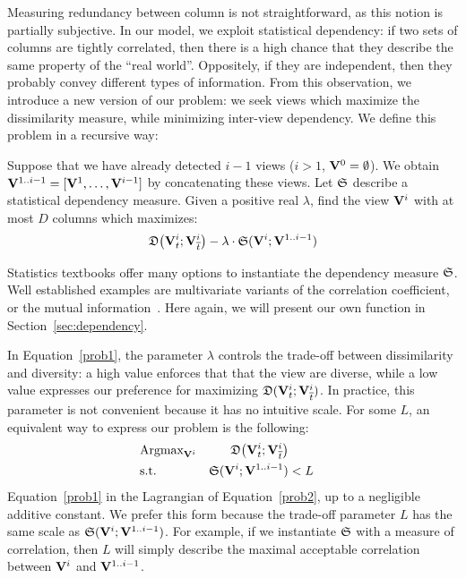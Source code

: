 Measuring redundancy between column is not straightforward, as this notion is
partially subjective. In our model, we exploit statistical dependency: if two
sets of columns are tightly correlated, then there is a high chance that they
describe the same property of the ``real world''.  Oppositely, if they are
independent, then they probably convey different types of information. From
this observation, we introduce a new version of our problem: we seek views
which maximize the dissimilarity measure, while minimizing inter-view dependency.
We define this problem in a recursive way:
\begin{problem}
    Suppose that we have already detected $i-1$ views ($i > 1$,
    $\mathbf{V}^{0} = \emptyset$). We obtain $\mathbf{V}^{1..i-1} = [\mathbf{V}^1, \ldots,
    \mathbf{V}^{i-1}]$ by concatenating these views. Let $\mathfrak{S}$ describe a
    statistical dependency measure. Given a positive real $\lambda$, find the
    view $\mathbf{V}^{i}$ with at most $D$ columns which maximizes:
        \begin{equation}
            \label{prob1}
            \mathfrak{D}\big( \mathbf{V}^{i}_t  ; \mathbf{V}^{i}_{\overline{t}} \big) - 
            \lambda \cdot \mathfrak{S} ( \mathbf{V}^{i} ; \mathbf{V}^{1..i-1})
        \end{equation}
\end{problem}
Statistics textbooks offer many options to instantiate the dependency measure
$\mathfrak{S}$. Well established examples are multivariate variants of the
correlation coefficient, or the mutual information~\cite{wasserman2013all}.
Here again, we will present our own function in Section~\ref{sec:dependency}.

In Equation~\ref{prob1}, the parameter $\lambda$ controls the trade-off between
dissimilarity and diversity: a high value enforces that that the view are
diverse, while a low value expresses our preference for maximizing $\mathfrak{D}(
\mathbf{V}^{i}_t  ; \mathbf{V}^{i}_{\overline{t}})$. In practice, this parameter is
not convenient because it has no intuitive scale. For some $L$, an
equivalent way to express our problem is the following:
\begin{equation}
    \label{prob2}
    \begin{aligned}
        & \text{Argmax}_{\mathbf{V}^{i}} 
            & \mathfrak{D}\big( \mathbf{V}^{i}_t  ; \mathbf{V}^{i}_{\overline{t}} \big)\\
        & \text{s.t.} 
        &\mathfrak{S} ( \mathbf{V}^{i} ; \mathbf{V}^{1..i-1}) & < L\\ 
    \end{aligned}
\end{equation}
Equation~\ref{prob1} in the Lagrangian of Equation~\ref{prob2}, up to a
negligible additive constant. We prefer this form because the trade-off
parameter $L$ has the same scale as $\mathfrak{S} ( \mathbf{V}^{i} ; \mathbf{V}^{1..i-1}) $.
For example, if we instantiate $\mathfrak{S}$ with a measure of correlation, then $L$ will
simply describe the maximal acceptable correlation between $\mathbf{V}^{i}$ and
$\mathbf{V}^{1..i-1}$.

